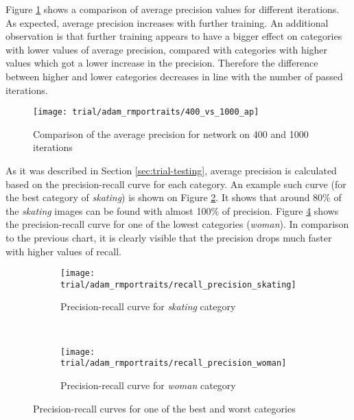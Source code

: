     Figure \ref{fig:trial-400-vs-1000} shows a comparison of average precision values for different iterations. As expected, average precision increases with further training. An additional observation is that further training appears to have a bigger effect on categories with lower values of average precision, compared with categories with higher values which got a lower increase in the precision. Therefore the difference between higher and lower categories decreases in line with the number of passed iterations.
    
    \begin{figure}[H]
        \centering
        \texttt{[image: trial/adam\_rmportraits/400\_vs\_1000\_ap]}
        \caption[Trial experiment. Comparison of the average precision for network on 400 and 1000 iterations]{Comparison of the average precision for network on 400 and 1000 iterations}
        \label{fig:trial-400-vs-1000}
    \end{figure}
    
    As it was described in Section \ref{sec:trial-testing}, average precision is calculated based on the precision-recall curve for each category. An example such curve (for the best category of \textit{skating}) is shown on Figure \ref{fig:trial-precision-recall-skating}. It shows that around 80\% of the \textit{skating} images can be found with almost 100\% of precision. Figure \ref{fig:trial-precision-recall-woman} shows the precision-recall curve for one of the lowest categories (\textit{woman}). In comparison to the previous chart, it is clearly visible that the precision drops much faster with higher values of recall.
    
    \begin{figure}[H]
    \centering
    \begin{subfigure}[a]{0.9\textwidth}
        \texttt{[image: trial/adam\_rmportraits/recall\_precision\_skating]}
        \caption[Trial experiment. Precision-recall curve for \textit{skating} category]{Precision-recall curve for \textit{skating} category}
        \label{fig:trial-precision-recall-skating}
    \end{subfigure}
    \\
    \begin{subfigure}[a]{0.9\textwidth}
        \texttt{[image: trial/adam\_rmportraits/recall\_precision\_woman]}
        \caption{Precision-recall curve for \textit{woman} category}
        \label{fig:trial-precision-recall-woman}
    \end{subfigure}
    \caption[Trial experiment. Precision-recall curves for one of the best and worst categories]{Precision-recall curves for one of the best and worst categories}
    \end{figure}
    

